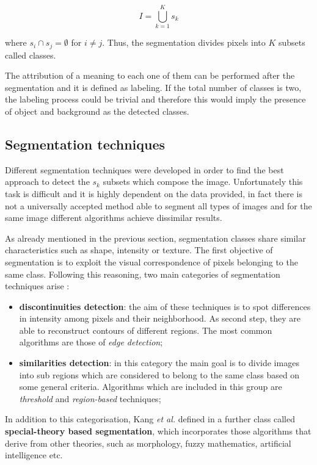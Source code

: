 \documentclass[../main.tex]{subfiles}
\begin{document}
\begin{equation}
    I = \bigcup_{k=1}^{K} s_{k}
\end{equation}

where $s_{i}\cap s_{j}=\emptyset$  for $i \not = j$. Thus, the segmentation divides pixels into $K$ subsets called classes.

The attribution of a meaning to each one of them can be performed after the segmentation and it is defined as labeling. If the total number of classes is two, the labeling process could be trivial and therefore this would imply the presence of object and background as the detected classes.   


\subsection{Segmentation techniques}

Different segmentation techniques were developed in order to find the best approach to detect the $s_{k}$ subsets which compose the image. Unfortunately this task is difficult and it is highly dependent on the data provided, in fact there is not a universally accepted method able to segment all types of images and for the same image different algorithms achieve dissimilar results.

As already mentioned in the previous section, segmentation classes share similar characteristics such as shape, intensity or texture. The first objective of segmentation is to exploit the visual correspondence of pixels belonging to the same class. Following this reasoning, two main categories of segmentation techniques arise \cite{segmentation_review_1}:

\begin{itemize}
    \item \textbf{discontinuities detection}: the aim of these techniques is to spot differences in intensity among pixels and their neighborhood. As second step, they are able to reconstruct contours of different regions. The most common algorithms are those of
    \textit{edge detection};
    \item \textbf{similarities detection}: in this category the main goal is to divide images into sub regions which are considered to belong to the same class based on some general criteria. Algorithms which are included in this group are \textit{threshold} and \textit{region-based} techniques;
\end{itemize}

In addition to this categorisation, Kang \textit{et al.} defined in \cite{kang2009comparative} a further class called \textbf{special-theory based segmentation}, which incorporates those algorithms that derive from other theories, such as  morphology, fuzzy mathematics, artificial intelligence etc.
\end{document}
